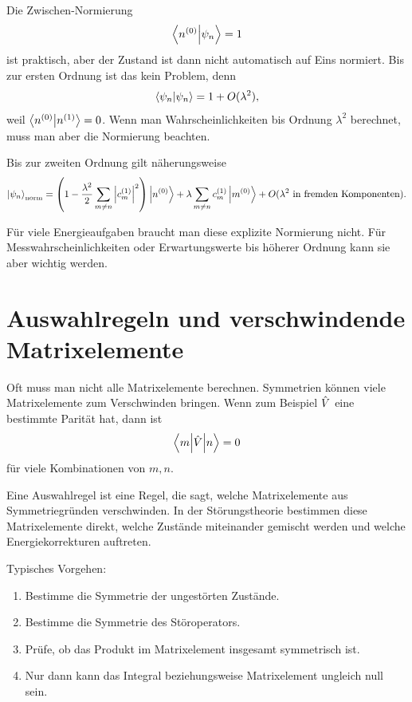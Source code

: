 Die Zwischen-Normierung
\[
    \left\langle n^{(0)}\middle|\psi_n\right\rangle=1
\]
ist praktisch, aber der Zustand ist dann nicht automatisch auf Eins normiert. Bis zur ersten Ordnung ist das kein Problem, denn
\[
    \left\langle\psi_n\middle|\psi_n\right\rangle
    =1+O(\lambda^2),
\]
weil \(\left\langle n^{(0)}\middle|n^{(1)}\right\rangle=0\). Wenn man Wahrscheinlichkeiten bis Ordnung \(\lambda^2\) berechnet, muss man aber die Normierung beachten.

Bis zur zweiten Ordnung gilt näherungsweise
\[
    \left|\psi_n\right\rangle_{\mathrm{norm}}
    =\left(1-\frac{\lambda^2}{2}\sum_{m\neq n}\left| c_m^{(1)} \right|^2\right)
    \left|n^{(0)}\right\rangle
    +\lambda\sum_{m\neq n}c_m^{(1)}\left|m^{(0)}\right\rangle
    +O(\lambda^2\text{ in fremden Komponenten}).
\]

\begin{notebox}
Für viele Energieaufgaben braucht man diese explizite Normierung nicht. Für Messwahrscheinlichkeiten oder Erwartungswerte bis höherer Ordnung kann sie aber wichtig werden.
\end{notebox}

\section{Auswahlregeln und verschwindende Matrixelemente}

Oft muss man nicht alle Matrixelemente berechnen. Symmetrien können viele Matrixelemente zum Verschwinden bringen. Wenn zum Beispiel \(\hat V\) eine bestimmte Parität hat, dann ist
\[
    \left\langle m\middle|\hat V\middle|n\right\rangle=0
\]
für viele Kombinationen von \(m,n\).

\begin{conceptbox}
Eine Auswahlregel ist eine Regel, die sagt, welche Matrixelemente aus Symmetriegründen verschwinden. In der Störungstheorie bestimmen diese Matrixelemente direkt, welche Zustände miteinander gemischt werden und welche Energiekorrekturen auftreten.
\end{conceptbox}

Typisches Vorgehen:
\begin{enumerate}
    \item Bestimme die Symmetrie der ungestörten Zustände.
    \item Bestimme die Symmetrie des Störoperators.
    \item Prüfe, ob das Produkt im Matrixelement insgesamt symmetrisch ist.
    \item Nur dann kann das Integral beziehungsweise Matrixelement ungleich null sein.
\end{enumerate}

